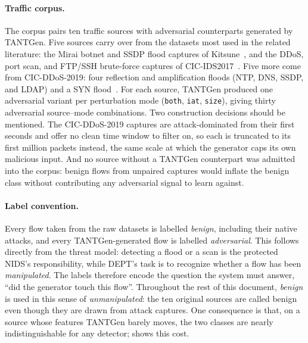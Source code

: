 \paragraph{Traffic corpus.}
The corpus pairs ten traffic sources with adversarial counterparts generated by
TANTGen. Five sources carry over from the datasets most used in the related literature:
the Mirai botnet and SSDP flood captures of Kitsune~\cite{mirsky2018kitsune}, and the
\ac{DDoS}, port scan, and FTP/SSH brute-force captures of
CIC-IDS2017~\cite{sharafaldin2018cicids}. Five more come from CIC-DDoS-2019: four
reflection and amplification floods (NTP, DNS, SSDP, and LDAP) and a SYN
flood~\cite{sharafaldin2019cicddos}. For each source, TANTGen produced one adversarial
variant per perturbation mode (\texttt{both}, \texttt{iat}, \texttt{size}), giving
thirty adversarial source--mode combinations. Two construction decisions should be mentioned.
The CIC-DDoS-2019 captures are attack-dominated from their first seconds and offer no
clean time window to filter on, so each is truncated to its first million packets
instead, the same scale at which the generator caps its own malicious input. And no
source without a TANTGen counterpart was admitted into the corpus: benign flows from
unpaired captures would inflate the benign class without contributing any adversarial
signal to learn against.

\paragraph{Label convention.}
Every flow taken from the raw datasets is labelled \emph{benign}, including their
native attacks, and every TANTGen-generated flow is labelled \emph{adversarial}. This
follows directly from the threat model: detecting a flood or a scan is the protected
\ac{NIDS}'s responsibility, while DEPT's task is to recognize whether a flow has been
\emph{manipulated}. The labels therefore encode the question the system must
answer, ``did the generator touch this flow''. Throughout the rest of this document,
\emph{benign} is used in this sense of \emph{unmanipulated}: the ten original sources are
called benign even though they are drawn from attack captures. One consequence is that,
on a source whose features TANTGen barely moves, the two classes are nearly
indistinguishable for any detector;  shows this cost.

